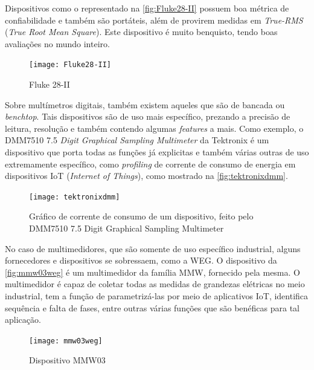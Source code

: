 Dispositivos como o representado na \autoref{fig:Fluke28-II} possuem boa métrica de confiabilidade e também são portáteis, além de provirem medidas em \textit{True-RMS} (\textit{True Root Mean Square}). Este dispositivo é muito benquisto, tendo boas avaliações no mundo inteiro.

\begin{figure}[htb!]%
    \caption{Fluke 28-II}%
    \label{fig:Fluke28-II}%
    \texttt{[image: Fluke28-II]}%
\end{figure}

Sobre multímetros digitais, também existem aqueles que são de bancada ou \textit{benchtop}. Tais dispositivos são de uso mais específico, prezando a precisão de leitura, resolução e também contendo algumas \textit{features} a mais. Como exemplo, o DMM7510 7.5 \textit{Digit Graphical Sampling Multimeter} da Tektronix é um dispositivo que porta todas as funções já explicitas e também várias outras de uso extremamente específico, como \textit{profiling} de corrente de consumo de energia em dispositivos \gls{IoT} (\textit{Internet of Things}), como mostrado na \autoref{fig:tektronixdmm}.

\begin{figure}[htb!]%
    \caption{Gráfico de corrente de consumo de um dispositivo, feito pelo DMM7510 7.5 Digit Graphical Sampling Multimeter}%
    \label{fig:tektronixdmm}%
    \texttt{[image: tektronixdmm]}%
\end{figure}

No caso de multimedidores, que são somente de uso específico industrial, alguns fornecedores e dispositivos se sobressaem, como a WEG. O dispositivo da \autoref{fig:mmw03weg} é um multimedidor da família MMW, fornecido pela mesma. O multimedidor é capaz de coletar todas as medidas de grandezas elétricas no meio industrial, tem a função de parametrizá-las por meio de aplicativos \gls{IoT}, identifica sequência e falta de fases, entre outras várias funções que são benéficas para tal aplicação.

\begin{figure}[htb!]%
    \caption{Dispositivo MMW03}%
    \label{fig:mmw03weg}%
    \texttt{[image: mmw03weg]}%
\end{figure}

